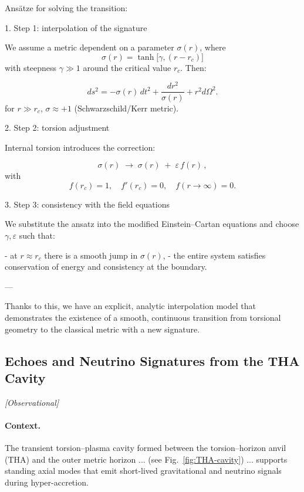 \documentclass{article}
\newcommand{\obstag}{\textcolor{green!60!black}{\textit{[Observational]}}}
\begin{document}
Ansätze for solving the transition:

1. Step 1: interpolation of the signature

We assume a metric dependent on a parameter $\sigma(r)$, where
$$\sigma(r) = \tanh\!\bigl[\gamma,(r-r_c)\bigr]$$
with steepness $\gamma\gg1$ around the critical value $r_c$. Then:

\begin{equation}\label{eq:auto67}
ds^2 = -\sigma(r)\,dt^2 + \frac{dr^2}{\sigma(r)} + r^2 d\Omega^2.
\end{equation}
for $r\gg r_c$, $\sigma\approx +1$ (Schwarzschild/Kerr metric).

2. Step 2: torsion adjustment

Internal torsion introduces the correction:

\begin{equation}\label{eq:auto68}
\sigma(r) \;\to\; \sigma(r)\;+\;\varepsilon\,f(r)\,,
\end{equation}
with
$$f(r_c)=1,\quad f'(r_c)=0,\quad f(r\to\infty)=0.$$

3. Step 3: consistency with the field equations

We substitute the ansatz into the modified Einstein–Cartan equations and choose $\gamma,\varepsilon$ such that:

- at $r\approx r_c$ there is a smooth jump in $\sigma(r)$,  
- the entire system satisfies conservation of energy and consistency at the boundary.

---

Thanks to this, we have an explicit, analytic interpolation model that demonstrates the existence of a smooth, continuous transition from torsional geometry to the classical metric with a new signature.


\subsection{Echoes and Neutrino Signatures from the THA Cavity}
\label{sec:THA-observables}
\obstag

\paragraph{Context.}
The transient torsion--plasma cavity formed between the torsion--horizon anvil (THA)
and the outer metric horizon ... (see Fig.~\ref{fig:THA-cavity}) ...
supports standing axial modes that emit short-lived gravitational and neutrino signals
during hyper-accretion.
\end{document}
